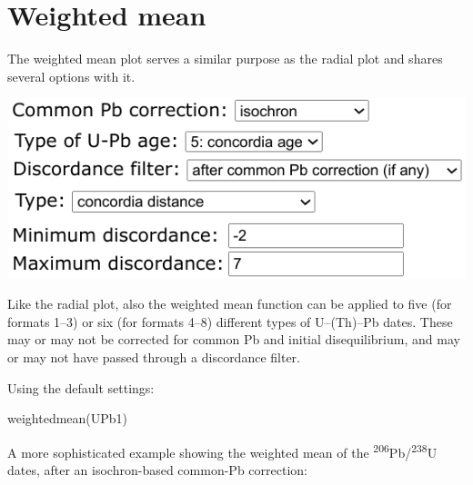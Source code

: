 \begin{refsection}
\begin{enumerate}

\end{enumerate}

\section{Weighted mean}
\label{sec:UPbWtdMean}

The weighted mean plot serves a similar purpose as the radial plot and
shares several options with it.

\noindent\begin{minipage}[t]{.5\linewidth}
\strut\vspace*{-\baselineskip}\newline
\includegraphics[width=\linewidth]{../figures/UPbWtdMeanAgeType.png}\\
\end{minipage}
\begin{minipage}[t]{.5\linewidth}
  Like the radial plot, also the weighted mean function can be applied
  to five (for formats 1--3) or six (for formats 4--8) different types
  of U--(Th)--Pb dates. These may or may not be corrected for common
  Pb and initial disequilibrium, and may or may not have passed
  through a discordance filter.
\end{minipage}

Using the default settings:
\begin{console}
weightedmean(UPb1)
\end{console}

A more sophisticated example showing the weighted mean of the
\textsuperscript{206}Pb/\textsuperscript{238}U dates, after an
isochron-based common-Pb correction:


\end{refsection}
